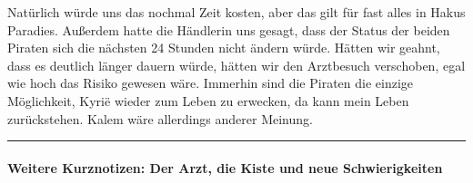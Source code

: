 \documentclass[11pt]{scrartcl}
\begin{document}
Natürlich würde uns das nochmal Zeit kosten, aber das gilt für fast
alles in Hakus Paradies. Außerdem hatte die Händlerin uns gesagt, dass
der Status der beiden Piraten sich die nächsten 24 Stunden nicht ändern
würde. Hätten wir geahnt, dass es deutlich länger dauern würde, hätten
wir den Arztbesuch verschoben, egal wie hoch das Risiko gewesen wäre.
Immerhin sind die Piraten die einzige Möglichkeit, Kyrië wieder zum
Leben zu erwecken, da kann mein Leben zurückstehen. Kalem wäre
allerdings anderer Meinung.

\begin{center}\rule{3in}{0.4pt}\end{center}

\paragraph{Weitere Kurznotizen: Der Arzt, die Kiste und neue
Schwierigkeiten}
\end{document}
